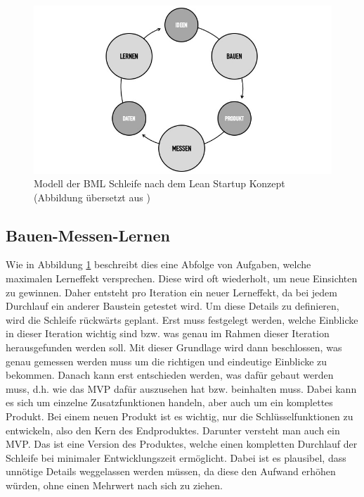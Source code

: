 \begin{figure}[h!]
	\begin{center}
		\includegraphics[scale=0.5]{99_IMG/02_Grundlagen/buildmeasurelearn.jpg}
		\caption[Modell der \ac{BML} Schleife nach dem Lean Startup Konzept]{Modell der \ac{BML} Schleife nach dem Lean Startup Konzept (Abbildung übersetzt aus )}
		\label{fig:LeanStartup_BuildMeasureLearn}
	\end{center}
\end{figure}

\subsection*{\label{sec:LeanStartup-BML}\thesubsection\quad Bauen-Messen-Lernen}
Wie in Abbildung \ref{fig:LeanStartup_BuildMeasureLearn} beschreibt dies eine Abfolge von Aufgaben, welche maximalen Lerneffekt versprechen. Diese wird oft wiederholt, um neue Einsichten zu gewinnen. Daher entsteht pro Iteration ein neuer Lerneffekt, da bei jedem Durchlauf ein anderer Baustein getestet wird. Um diese Details zu definieren, wird die Schleife rückwärts geplant. Erst muss festgelegt werden, welche Einblicke in dieser Iteration wichtig sind bzw. was genau im Rahmen dieser Iteration herausgefunden werden soll. Mit dieser Grundlage wird dann beschlossen, was genau gemessen werden muss um die richtigen und eindeutige Einblicke zu bekommen. Danach kann erst entschieden werden, was dafür gebaut werden muss, d.h. wie das \ac{MVP} dafür auszusehen hat bzw. beinhalten muss. Dabei kann es sich um einzelne Zusatzfunktionen handeln, aber auch um ein komplettes Produkt. Bei einem neuen Produkt ist es wichtig, nur die Schlüsselfunktionen zu entwickeln, also den Kern des Endproduktes. Darunter versteht man auch ein \ac{MVP}. Das ist eine Version des Produktes, welche einen kompletten Durchlauf der Schleife bei minimaler Entwicklungszeit ermöglicht. Dabei ist es plausibel, dass unnötige Details weggelassen werden müssen, da diese den Aufwand erhöhen würden, ohne einen Mehrwert nach sich zu ziehen.

